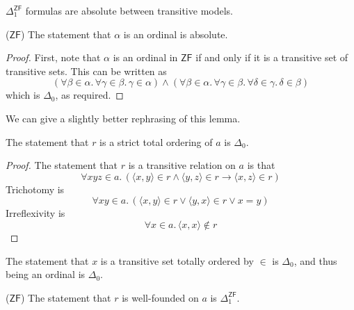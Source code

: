 \begin{corollary}
    \( \Delta_1^{\mathsf{ZF}} \) formulas are absolute between transitive models.
\end{corollary}
\begin{lemma}
    (\( \mathsf{ZF} \))
    The statement that \( \alpha \) is an ordinal is absolute.
\end{lemma}
\begin{proof}
    First, note that \( \alpha \) is an ordinal in \( \mathsf{ZF} \) if and only if it is a transitive set of transitive sets.
    This can be written as
    \[ (\forall \beta \in \alpha.\, \forall \gamma \in \beta.\, \gamma \in \alpha) \wedge (\forall \beta \in \alpha.\, \forall \gamma \in \beta.\, \forall \delta \in \gamma.\, \delta \in \beta) \]
    which is \( \Delta_0 \), as required.
\end{proof}
We can give a slightly better rephrasing of this lemma.
\begin{lemma}
    The statement that \( r \) is a strict total ordering of \( a \) is \( \Delta_0 \).
\end{lemma}
\begin{proof}
    The statement that \( r \) is a transitive relation on \( a \) is that
    \[ \forall x y z \in a.\, (\langle x, y \rangle \in r \wedge \langle y, z \rangle \in r \to \langle x, z \rangle \in r) \]
    Trichotomy is
    \[ \forall x y \in a.\, (\langle x, y \rangle \in r \vee \langle y, x \rangle \in r \vee x = y) \]
    Irreflexivity is
    \[ \forall x \in a.\, \langle x, x \rangle \notin r \]
\end{proof}
\begin{corollary}
    The statement that \( x \) is a transitive set totally ordered by \( \in \) is \( \Delta_0 \), and thus being an ordinal is \( \Delta_0 \).
\end{corollary}
\begin{lemma}
    (\( \mathsf{ZF} \))
    The statement that \( r \) is well-founded on \( a \) is \( \Delta_1^{\mathsf{ZF}} \).
\end{lemma}
